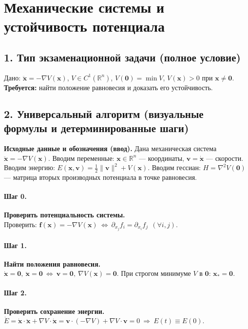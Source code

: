 \section{Механические системы и устойчивость потенциала}

\subsection*{1. Тип экзаменационной задачи (полное условие)}
Дано: \(\ddot{\mathbf x}=-\nabla V(\mathbf x)\), \(V\in C^{1}(\mathbb R^{n})\), 
\(V(\mathbf 0)=\min V\), \(V(\mathbf x)>0\) при \(\mathbf x\neq \mathbf 0\). 
\textbf{Требуется:} найти положение равновесия и доказать его устойчивость.

\subsection*{2. Универсальный алгоритм (визуальные формулы и детерминированные шаги)}

\textbf{Исходные данные и обозначения (ввод).} Дана механическая система \(\ddot{\mathbf x}=-\nabla V(\mathbf x)\).
Вводим переменные: \(\mathbf x\in\mathbb R^{n}\) — координаты, \(\mathbf v=\dot{\mathbf x}\) — скорости.
Вводим энергию: \(E(\mathbf x,\mathbf v)=\tfrac12\|\mathbf v\|^{2}+V(\mathbf x)\).
Вводим гессиан: \(H=\nabla^{2}V(\mathbf 0)\) — матрица вторых производных потенциала в точке равновесия.

\paragraph{Шаг 0.} \textbf{Проверить потенциальность системы.}\\
Проверить: \(\mathbf f(\mathbf x)=-\nabla V(\mathbf x)\ \Leftrightarrow\ \partial_{x_j}f_i=\partial_{x_i}f_j\ \ (\forall i,j)\).

\paragraph{Шаг 1.} \textbf{Найти положения равновесия.}\\
\(\dot{\mathbf x}=\mathbf 0,\ \ddot{\mathbf x}=\mathbf 0\ \Longleftrightarrow\ \mathbf v=\mathbf 0,\ \nabla V(\mathbf x)=\mathbf 0\). 
При строгом минимуме \(V\) в \(\mathbf 0\): \(\boxed{\mathbf x_*=\mathbf 0}\).

\paragraph{Шаг 2.} \textbf{Проверить сохранение энергии.}\\
\(\dot E=\dot{\mathbf x}\cdot\ddot{\mathbf x}+\nabla V\cdot\dot{\mathbf x}
=\mathbf v\cdot(-\nabla V)+\nabla V\cdot\mathbf v=0
\ \Rightarrow\ \boxed{E(t)\equiv E(0)}\).

